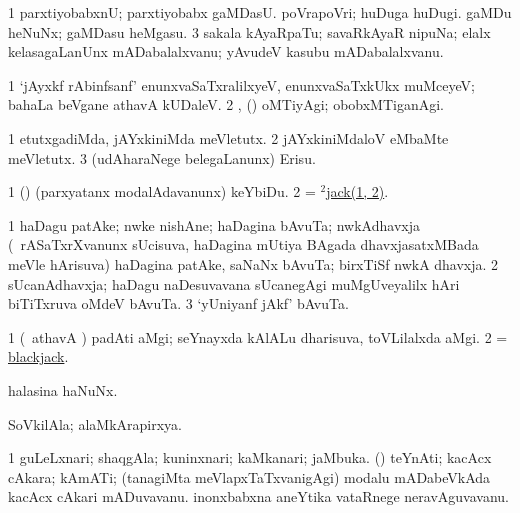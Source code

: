 \noindent
\gl{\pagu}
\bmng
\bnum
\num{1}  parxtiyobabxnU; parxtiyobabx gaMDasU. 
  
\banum
{} poVrapoVri; huDuga huDugi. 
 gaMDu heNuNx; gaMDasu heMgasu. 
\eanum
\numie
\num{3}  sakala kAyaRpaTu; savaRkAyaR nipuNa; elalx kelasagaLanUnx mADabalalxvanu; yAvudeV kasubu mADabalalxvanu. 
\enum
\emng

\noindent
\gl{\nuga}
\bmng
\bnum
\num{1}  `jAyxkf rAbinfsanf' enunxvaSaTxralilxyeV, enunxvaSaTxkUkx muMceyeV; bahaLa beVgane athavA kUDaleV. 
\num{2} ,  (\ashi) oMTiyAgi; obobxMTiganAgi. 
\enum
\emng
\eentry

\bentry
{}
\gl{\sakirx}
\bmng
\bnum
\num{1} etutxgadiMda, jAYxkiniMda meVletutx. 
\num{2} jAYxkiniMdaloV eMbaMte meVletutx. 
\num{3} (udAharaNege belegaLanunx) Erisu. 
\enum
\emng

\noindent
\gl{\pagu}
\bmng
\bnum
\num{1}   (\ashi) (parxyatanx modalAdavanunx) keYbiDu. 
\num{2}  = \hyperlink{jack(2)}{$^2$jack(1, 2)}. 
\enum
\emng
\eentry

\bentry
{}
\gl{\nA}
\bmng
\bnum
\num{1} haDagu patAke; nwke nishAne; haDagina bAvuTa; nwkAdhavxja (\kanmu\ rASaTxrXvanunx sUcisuva, haDagina mUtiya BAgada dhavxjasatxMBada meVle hArisuva) haDagina patAke, saNaNx bAvuTa;  birxTiSf nwkA dhavxja. 
\num{2} sUcanAdhavxja; haDagu naDesuvavana sUcanegAgi muMgUveyalilx hAri biTiTxruva oMdeV bAvuTa. 
\num{3} `yUniyanf jAkf' bAvuTa. 
\enum
\emng
\eentry

\bentry
{}
\gl{\nA}
\bmng
\bnum
\num{1} (\pArxparx\ athavA \ca) padAti aMgi; seYnayxda kAlALu dharisuva, toVLilalxda aMgi. 
\num{2} = \hyperref{kandict_b.pdf}{B}{blackjack}{blackjack}. 
\enum
\emng
\eentry

\bentry
{}
\gl{\nA}
\bmng
halasina haNuNx. 
\emng
\eentry

\bentry
{}
\gl{\nA}
\bmng
SoVkilAla; alaMkArapirxya. 
\emng
\eentry

\bentry
{}
\gl{\nA}
\bmng
\bnum
\num{1} guLeLxnari; shaqgAla; kuninxnari; kaMkanari; jaMbuka.   
 (\rUpa) teYnAti; 
\banum
{} kacAcx cAkara; kAmATi; (tanagiMta meVlapxTaTxvanigAgi) modalu mADabeVkAda kacAcx cAkari mADuvavanu. 
 inonxbabxna aneYtika vataRnege neravAguvavanu. 
\eanum
\numie
\enum
\emng
\eentry

